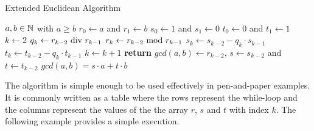 \begin{algorithm}\caption{Extended Euclidean Algorithm}
\label{alg_ext_euclid_alg}
\begin{algorithmic}[0]
\Require $a,b \in \mathbb{N}$ with $a\geq b$
\State $r_0\gets a$ and $r_1\gets b$
\State $s_0\gets 1$ and $s_1\gets 0$
\State $t_0\gets 0$ and $t_1\gets 1$
\State $k\gets 2$
\State $ q_k\gets r_{k-2} \text{ div } r_{k-1} $
\State $ r_{k}\gets r_{k-2} \text{ mod } r_{k-1} $
\State $ s_{k}\gets s_{k-2} -q_k \cdot s_{k-1} $
\State $ t_{k}\gets t_{k-2} -q_k \cdot t_{k-1} $
\State $ k \gets k + 1 $
\EndWhile
\State \textbf{return} $gcd(a,b)\gets r_{k-2}$, $s\gets s_{k-2}$ and $ t \gets t_{k-2} $
\EndProcedure
\Ensure $ gcd (a, b) = s \cdot a + t \cdot b $
\end{algorithmic}
\end{algorithm}
The algorithm is simple enough to be used effectively in pen-and-paper examples. It is commonly written as a table where the rows represent the while-loop and the columns represent the values of the the array $r$, $s$ and $t$ with index $k$. The following example provides a simple execution.
